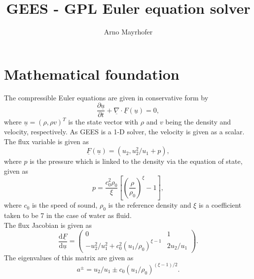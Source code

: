 \documentclass[a4paper]{article}
\newcommand{\uvec}[1]{\underline{#1}}
\newcommand{\unabla}{\uvec{\nabla}}
\newcommand{\td}{\mbox{d}}
\begin{document}
\title{GEES - GPL Euler equation solver}
\author{Arno Mayrhofer}

\maketitle

\section{Mathematical foundation}
The compressible Euler equations are given in conservative form by
\begin{equation}
\frac{\partial \uvec{u}}{\partial t} + \unabla \cdot \uvec{F}(\uvec{u}) = 0,
\label{e:euler}
\end{equation}
where $\uvec{u} = (\rho, \rho v)^T$ is the state vector with $\rho$ and $v$ being the density and velocity, respectively. As GEES is a 1-D solver, the velocity is given as a scalar. The flux variable is given as
\begin{equation}
\uvec{F}(\uvec{u}) = (u_2, u_2^2/u_1 + p),
\label{e:flux}
\end{equation}
where $p$ is the pressure which is linked to the density via the equation of state, given as
\begin{equation}
p = \frac{c_0^2 \rho_0}{\xi}\left[ \left(\frac{\rho}{\rho_0} \right)^\xi - 1\right],
\label{e:eos}
\end{equation}
where $c_0$ is the speed of sound, $\rho_0$ is the reference density and $\xi$ is a coefficient taken to be 7 in the case of water as fluid.
\\
The flux Jacobian is given as
\begin{equation}
\frac{\td \uvec{F}}{\td \uvec{u}} =
\begin{pmatrix}
0 & 1 \\
-u_2^2/u_1^2 + c_0^2 (u_1/\rho_0)^{\xi-1} & 2 u_2/u_1
\end{pmatrix}.
\label{e:jacobian}
\end{equation}
The eigenvalues of this matrix are given as
\begin{equation}
a^\pm = u_2/u_1 \pm c_0(u_1/\rho_0)^{(\xi-1)/2}.
\label{e:ev}
\end{equation}
\end{document}
